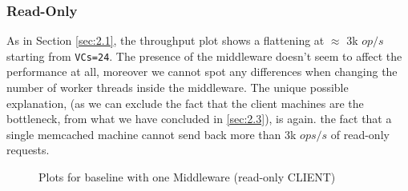 \documentclass[11pt,a4paper]{article}
\begin{document}
\subsubsection*{Read-Only}

As in Section \ref{sec:2.1}, the throughput plot shows a flattening at $\approx$ 3k $op/s$ starting from \texttt{VCs=24}.  The presence of the middleware doesn't seem to affect the performance at all, moreover we cannot spot any differences when changing the number of worker threads inside the middleware. The unique possible explanation, (as we can exclude the fact that the client machines are the bottleneck, from what we have concluded in \ref{sec:2.3}), is again. the fact that a single memcached machine cannot send back more than 3k $ops/s$ of read-only requests.

\begin{figure}[!h]
  \centering
  \caption{Plots for baseline with one Middleware (read-only CLIENT)}
  \label{fig:baseline_mw_1_mw_mt_ro}
\end{figure}
\end{document}

